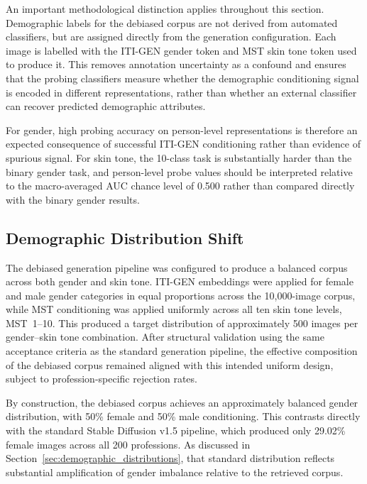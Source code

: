 An important methodological distinction applies throughout this section. Demographic labels for the debiased corpus are not derived from automated classifiers, but are assigned directly from the generation configuration. Each image is labelled with the ITI-GEN gender token and MST skin tone token used to produce it. This removes annotation uncertainty as a confound and ensures that the probing classifiers measure whether the demographic conditioning signal is encoded in different representations, rather than whether an external classifier can recover predicted demographic attributes.

For gender, high probing accuracy on person-level representations is therefore an expected consequence of successful ITI-GEN conditioning rather than evidence of spurious signal. For skin tone, the 10-class task is substantially harder than the binary gender task, and person-level probe values should be interpreted relative to the macro-averaged AUC chance level of 0.500 rather than compared directly with the binary gender results.

\subsection{Demographic Distribution Shift}
\label{subsec:debias_distribution}

The debiased generation pipeline was configured to produce a balanced corpus across both gender and skin tone. ITI-GEN embeddings were applied for female and male gender categories in equal proportions across the 10,000-image corpus, while MST conditioning was applied uniformly across all ten skin tone levels, MST~1--10. This produced a target distribution of approximately 500 images per gender--skin tone combination. After structural validation using the same acceptance criteria as the standard generation pipeline, the effective composition of the debiased corpus remained aligned with this intended uniform design, subject to profession-specific rejection rates.

By construction, the debiased corpus achieves an approximately balanced gender distribution, with 50\% female and 50\% male conditioning. This contrasts directly with the standard Stable Diffusion v1.5 pipeline, which produced only 29.02\% female images across all 200 professions. As discussed in Section~\ref{sec:demographic_distributions}, that standard distribution reflects substantial amplification of gender imbalance relative to the retrieved corpus.

